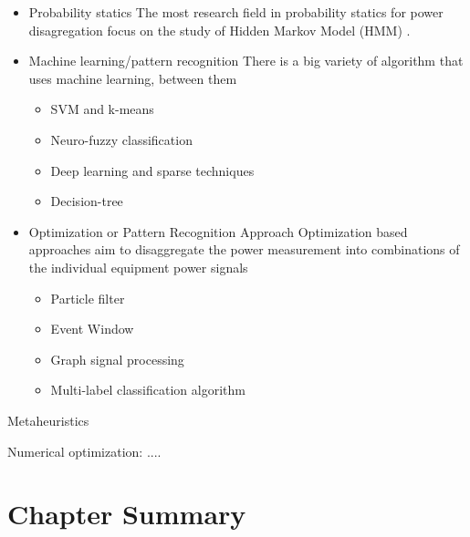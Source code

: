 \begin{itemize}
    \item Probability statics
    The most research field in probability statics for power disagregation focus on the study of Hidden Markov Model (HMM) \cite{kim2011unsupervised}.
    \item Machine learning/pattern recognition
    There is a big variety of algorithm that uses machine learning, between them 
    \begin{itemize}
        \item SVM and k-means \cite{altrabalsi2014low}
        \item Neuro-fuzzy classification \cite{lin2014non}
        \item Deep learning and sparse techniques \cite{kelly2015neural}
        \item Decision-tree
    \end{itemize}
    \item Optimization or Pattern Recognition Approach
    Optimization based approaches aim to disaggregate the power measurement into combinations of the individual equipment power signals
        \begin{itemize}
        \item Particle filter
        \item Event Window
        \item Graph signal processing
        \item Multi-label classification algorithm
    \end{itemize}
\end{itemize}



Metaheuristics

Numerical optimization:
....



\section{Chapter Summary}
